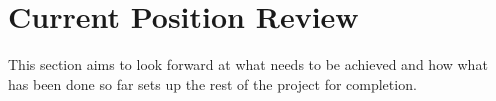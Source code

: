 
\section{Current Position Review}

This section aims to look forward at what needs to be achieved and how what has been done so far sets up the rest of the project for completion.

\subsection{}
